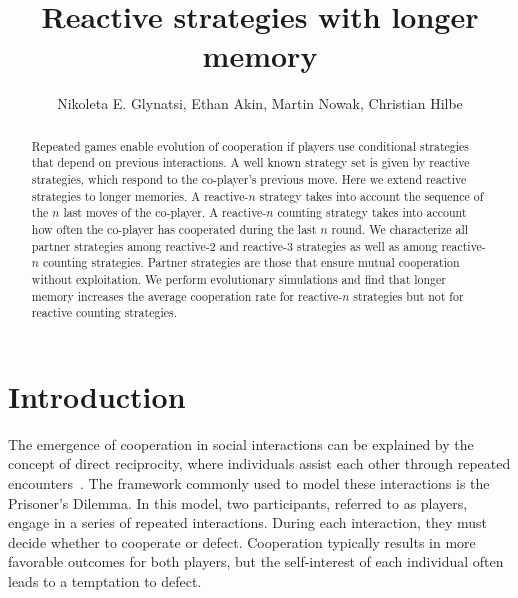 \documentclass{article}
\title{Reactive strategies with longer memory}
\author{Nikoleta E. Glynatsi, Ethan Akin, Martin Nowak, Christian Hilbe}
\date{}
\theoremstyle{definition}
\begin{document}
\maketitle

\begin{abstract}

Repeated games enable evolution of cooperation if players use conditional
strategies that depend on previous interactions. A well known strategy set is
given by reactive strategies, which respond to the co-player's previous move.
Here we extend reactive strategies to longer memories. A reactive-$n$ strategy
takes into account the sequence of the $n$ last moves of the co-player. A
reactive-$n$ counting strategy takes into account how often the co-player has
cooperated during the last $n$ round. We characterize all partner strategies among
reactive-2 and reactive-3 strategies as well as among reactive-$n$ counting
strategies. Partner strategies are those that ensure mutual cooperation without
exploitation. We perform evolutionary simulations and find that longer memory
increases the average cooperation rate for reactive-$n$ strategies but not for
reactive counting strategies.

\end{abstract}

\section{Introduction}

The emergence of cooperation in social interactions can be explained by the
concept of direct reciprocity, where individuals assist each other through
repeated encounters~\cite{axelrod:AAAS:1981, nowak:Science:2006, sigmund2010}.
The framework commonly used to model these interactions is the Prisoner's
Dilemma. In this model, two participants, referred to as players, engage in a
series of repeated interactions. During each interaction, they must decide
whether to cooperate or defect. Cooperation typically results in more favorable
outcomes for both players, but the self-interest of each individual often leads
to a temptation to defect.
\end{document}
